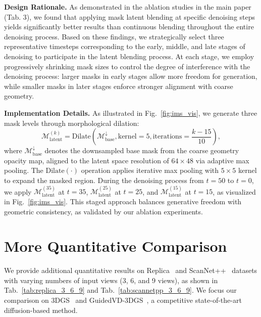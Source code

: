 \noindent\textbf{Design Rationale.} 
As demonstrated in the ablation studies in the main paper (Tab. 3), we found that applying mask latent blending at specific denoising steps yields significantly better results than continuous blending throughout the entire denoising process. Based on these findings, we strategically select three representative timesteps corresponding to the early, middle, and late stages of denoising to participate in the latent blending process. At each stage, we employ progressively shrinking mask sizes to control the degree of interference with the denoising process: larger masks in early stages allow more freedom for generation, while smaller masks in later stages enforce stronger alignment with coarse geometry.




\noindent\textbf{Implementation Details.}
As illustrated in Fig.~\ref{fig:ims_vis}, we generate three mask levels through morphological dilation:
\begin{equation}
\mathcal{M}_{\text{latent}}^{(k)} = \text{Dilate}(\mathcal{M}_{\text{base}}^{\downarrow}, \text{kernel}=5, \text{iterations}=\frac{k-15}{10}),
\end{equation}
where $\mathcal{M}_{\text{base}}^{\downarrow}$ denotes the downsampled base mask from the coarse geometry opacity map, aligned to the latent space resolution of $64 \times 48$ via adaptive max pooling. The $\text{Dilate}(\cdot)$ operation applies iterative max pooling with $5 \times 5$ kernel to expand the masked region. During the denoising process from $t = 50$ to $t = 0$, we apply $\mathcal{M}_{\text{latent}}^{(35)}$ at $t = 35$, $\mathcal{M}_{\text{latent}}^{(25)}$ at $t = 25$, and $\mathcal{M}_{\text{latent}}^{(15)}$ at $t = 15$, as visualized in Fig.~\ref{fig:ims_vis}. This staged approach balances generative freedom with geometric consistency, as validated by our ablation experiments.






\section{More Quantitative Comparison}
\label{sec:quant}
We provide additional quantitative results on Replica~\cite{straub2019replica} and ScanNet++~\cite{yeshwanth2023scannet++} datasets with varying numbers of input views (3, 6, and 9 views), as shown in Tab.~\ref{tab:replica_3_6_9} and Tab.~\ref{tab:scannetpp_3_6_9}. We focus our comparison on 3DGS~\cite{kerbl20233d} and GuidedVD-3DGS~\cite{zhong2025taming}, a competitive state-of-the-art diffusion-based method.

